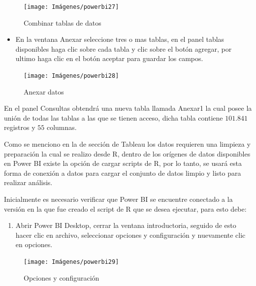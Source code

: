 \documentclass[
]{book}
\providecommand{\tightlist}{%
  \setlength{\itemsep}{0pt}\setlength{\parskip}{0pt}}
\begin{document}
\begin{figure}

{\centering \texttt{[image: Imágenes/powerbi27]} 

}

\caption{Combinar tablas de datos}\label{fig:combinardatos-fig}
\end{figure}

\begin{itemize}
\tightlist
\item
  En la ventana Anexar seleccione tres o mas tablas, en el panel tablas disponibles haga clic sobre cada tabla y clic sobre el botón agregar, por ultimo haga clic en el botón aceptar para guardar los campos.
\end{itemize}

\begin{figure}

{\centering \texttt{[image: Imágenes/powerbi28]} 

}

\caption{Anexar datos}\label{fig:anexardatos-fig}
\end{figure}

En el panel Consultas obtendrá una nueva tabla llamada Anexar1 la cual posee la unión de todas las tablas a las que se tienen acceso, dicha tabla contiene \(101.841\) registros y \(55\) columnas.

Como se menciono en la de sección de Tableau los datos requieren una limpieza y preparación la cual se realizo desde R, dentro de los orígenes de datos disponibles en Power BI existe la opción de cargar scripts de R, por lo tanto, se usará esta forma de conexión a datos para cargar el conjunto de datos limpio y listo para realizar análisis.

Inicialmente es necesario verificar que Power BI se encuentre conectado a la versión en la que fue creado el script de R que se desea ejecutar, para esto debe:

\begin{enumerate}
\def\labelenumi{\arabic{enumi}.}
\tightlist
\item
  Abrir Power BI Desktop, cerrar la ventana introductoria, seguido de esto hacer clic en archivo, seleccionar opciones y configuración y nuevamente clic en opciones.
\end{enumerate}

\begin{figure}

{\centering \texttt{[image: Imágenes/powerbi29]} 

}

\caption{Opciones y configuración}\label{fig:opcionesyconfiguracion-fig}
\end{figure}
\end{document}
